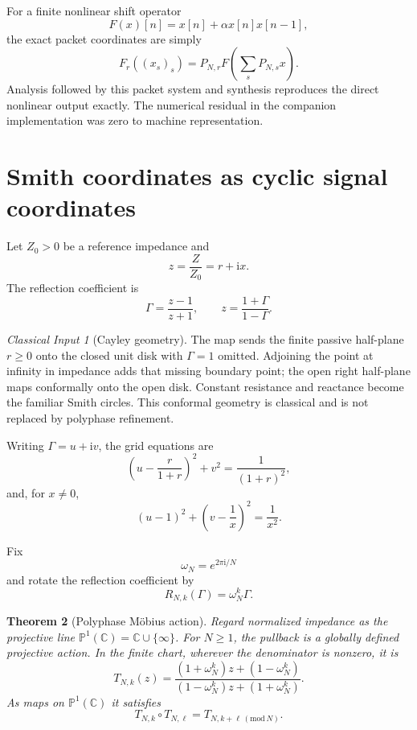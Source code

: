 \documentclass[11pt,a4paper]{article}
\newtheorem{theorem}{Theorem}[section]
\theoremstyle{definition}
\theoremstyle{remark}
\newtheorem{classical}[theorem]{Classical Input}
\newcommand{\bbC}{\mathbb C}
\newcommand{\Gam}{\Gamma}
\newcommand{\ii}{\mathrm i}
\begin{document}
For a finite nonlinear shift operator
\[
F(x)[n]=x[n]+\alpha x[n]x[n-1],
\]
the exact packet coordinates are simply
\[
F_r((x_s)_s)=P_{N,r}F\!\left(\sum_sP_{N,s}x\right).
\]
Analysis followed by this packet system and synthesis reproduces the direct nonlinear output exactly. The numerical residual in the companion implementation was zero to machine representation.

\section{Smith coordinates as cyclic signal coordinates}\label{core:section:13}

Let $Z_0>0$ be a reference impedance and
\[
z=\frac{Z}{Z_0}=r+\ii x.
\]
The reflection coefficient is
\[
\boxed{
\Gam=\frac{z-1}{z+1},
\qquad
z=\frac{1+\Gam}{1-\Gam}.
}
\]

\begin{classical}[Cayley geometry]\label{core:record:30}
The map sends the finite passive half-plane $r\ge0$ onto the closed unit disk with $\Gam=1$ omitted. Adjoining the point at infinity in impedance adds that missing boundary point; the open right half-plane maps conformally onto the open disk. Constant resistance and reactance become the familiar Smith circles. This conformal geometry is classical and is not replaced by polyphase refinement.
\end{classical}

Writing $\Gam=u+\ii v$, the grid equations are
\[
\left(u-\frac{r}{1+r}\right)^2+v^2=\frac1{(1+r)^2},
\]
and, for $x\ne0$,
\[
(u-1)^2+\left(v-\frac1x\right)^2=\frac1{x^2}.
\]

Fix
\[
\omega_N=e^{2\pi\ii/N}
\]
and rotate the reflection coefficient by
\[
R_{N,k}(\Gam)=\omega_N^k\Gam.
\]

\begin{theorem}[Polyphase M\"obius action]\label{result:18}
Regard normalized impedance as the projective line $\mathbb P^1(\bbC)=\bbC\cup\{\infty\}$. For $N\ge1$, the pullback is a globally defined projective action. In the finite chart, wherever the denominator is nonzero, it is
\[
\boxed{
T_{N,k}(z)
=
\frac{(1+\omega_N^k)z+(1-\omega_N^k)}
{(1-\omega_N^k)z+(1+\omega_N^k)}.
}
\]
As maps on $\mathbb P^1(\bbC)$ it satisfies
\[
T_{N,k}\circ T_{N,\ell}=T_{N,k+\ell\, (\mathrm{mod}\,N)}.
\]
\end{theorem}
\end{document}
